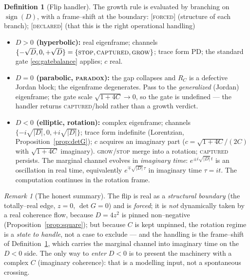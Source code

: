 \documentclass[11pt]{article}
\theoremstyle{plain}
\theoremstyle{definition}
\newtheorem{definition}[theorem]{Definition}
\theoremstyle{remark}
\newtheorem{remark}[theorem]{Remark}
\newcommand{\forced}{\textcolor{forcedc}{\textsc{[forced]}}}
\newcommand{\declared}{\textcolor{declaredc}{\textsc{[declared]}}}
\newcommand{\abs}[1]{\left\lvert #1 \right\rvert}
\begin{document}
\begin{definition}[Flip handler]\label{def:handler}
The growth rule is evaluated by branching on $\operatorname{sign}(D)$, with a frame--shift at the boundary: \forced{} (structure of each branch); \declared{} (that this is the right operational handling)
\begin{itemize}[leftmargin=1.6em,itemsep=2pt]
\item \textbf{$D>0$ (hyperbolic):} real eigenframe; channels $\{-\sqrt D,0,+\sqrt D\}=\{\textsc{stop},\textsc{captured},\textsc{grow}\}$; trace form PD; the standard gate \eqref{eq:gatebalance} applies; $c$ real.
\item \textbf{$D=0$ (parabolic, \textsc{paradox}):} the gap collapses and $R_C$ is a defective Jordan block; the eigenframe degenerates. Pass to the \emph{generalized} (Jordan) eigenframe; the gate scale $\sqrt{1+4C}\to0$, so the gate is undefined --- the handler returns \textsc{captured}/hold rather than a growth verdict.
\item \textbf{$D<0$ (elliptic, rotation):} complex eigenframe; channels $\{-i\sqrt{\abs D},0,+i\sqrt{\abs D}\}$; trace form indefinite (Lorentzian, Proposition~\ref{prop:detG}); $c$ acquires an imaginary part ($c=\sqrt{1+4C}/(2C)$ with $\sqrt{1+4C}$ imaginary). \textsc{grow}/\textsc{stop} merge into a rotation; \textsc{captured} persists. The marginal channel evolves in \emph{imaginary time}: $e^{\pm i\sqrt{\abs D}\,t}$ is an oscillation in real time, equivalently $e^{\mp\sqrt{\abs D}\,\tau}$ in imaginary time $\tau=it$. The computation continues in the rotation frame.
\end{itemize}
\end{definition}

\begin{remark}[The honest summary]\label{rem:honest}
The flip is real as a \emph{structural boundary} (the totally--real edge, $z=0$, $\det G=0$) and is \emph{forced}; it is \emph{not} dynamically taken by a real coherence flow, because $D=4z^2$ is pinned non--negative (Proposition~\ref{prop:square}); but because $C$ is kept unpinned, the rotation regime is a \emph{state to handle}, not a case to exclude --- and the handling is the frame--shift of Definition~\ref{def:handler}, which carries the marginal channel into imaginary time on the $D<0$ side. The only way to \emph{enter} $D<0$ is to present the machinery with a complex $C$ (imaginary coherence): that is a modelling input, not a spontaneous crossing.
\end{remark}
\end{document}
